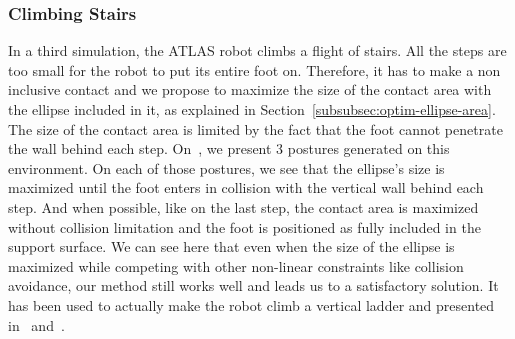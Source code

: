 %



\subsubsection{Climbing Stairs}
\label{subsubsec:smallStairs}


In a third simulation, the ATLAS robot climbs a flight of stairs.
All the steps are too small for the robot to put its entire foot on.
Therefore, it has to make a non inclusive contact and we propose to maximize the size of the contact area with the ellipse included in it, as explained in Section~\ref{subsubsec:optim-ellipse-area}.
The size of the contact area is limited by the fact that the foot cannot penetrate the wall behind each step.
On~, we present 3 postures generated on this environment.
On each of those postures, we see that the ellipse's size is maximized until the foot enters in collision with the vertical wall behind each step.
And when possible, like on the last step, the contact area is maximized without collision limitation and the foot is positioned as fully included in the support surface.
We can see here that even when the size of the ellipse is maximized while competing with other non-linear constraints like collision avoidance, our method still works well and leads us to a satisfactory solution.
It has been used to actually make the robot climb a vertical ladder and presented in~\cite{vaillant:autonomousrobots:2016} and~\cite{vaillant:humanoids:2014}.


